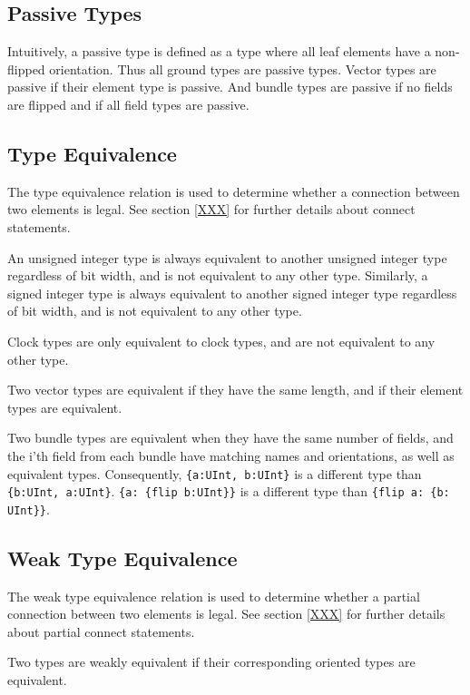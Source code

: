 \documentclass[12pt]{article}
\begin{document}
\subsection{Passive Types}

Intuitively, a passive type is defined as a type where all leaf elements have a non-flipped orientation. Thus all ground types are passive types. Vector types are passive if their element type is passive. And bundle types are passive if no fields are flipped and if all field types are passive.

\subsection{Type Equivalence}

The type equivalence relation is used to determine whether a connection between two elements is legal. See section \ref{XXX} for further details about connect statements.

An unsigned integer type is always equivalent to another unsigned integer type regardless of bit width, and is not equivalent to any other type. Similarly, a signed integer type is always equivalent to another signed integer type regardless of bit width, and is not equivalent to any other type. 

Clock types are only equivalent to clock types, and are not equivalent to any other type.

Two vector types are equivalent if they have the same length, and if their element types are equivalent.

Two bundle types are equivalent when they have the same number of fields, and the i'th field from each bundle have matching names and orientations, as well as equivalent types. Consequently, \verb|{a:UInt, b:UInt}| is a different type than \verb|{b:UInt, a:UInt}|. \verb|{a: {flip b:UInt}}| is a different type than \verb|{flip a: {b: UInt}}|.

\subsection{Weak Type Equivalence}

The weak type equivalence relation is used to determine whether a partial connection between two elements is legal. See section \ref{XXX} for further details about partial connect statements.

Two types are weakly equivalent if their corresponding oriented types are equivalent.
\end{document}
